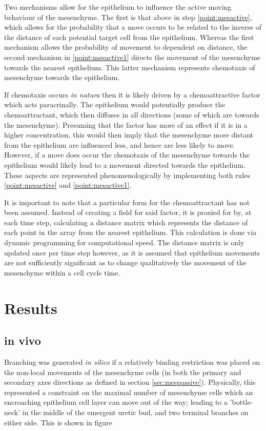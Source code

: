 \documentclass[pdftex,10pt,a4paper,twocolumn]{article}
\begin{document}
Two mechanisms allow for the epithelium to influence the active moving behaviour of the mesenchyme. The first is that above in step \ref{point:mesactive}, which allows for the probability that a move occurs to be related to the inverse of the distance of each potential target cell from the epithelium. Whereas the first mechanism allows the probability of movement to dependent on distance, the second mechanism in \ref{point:mesactive1} directs the movement of the mesenchyme towards the nearest epithelium. This latter mechanism represents chemotaxis of mesenchyme towards the epithelium.

If chemotaxis occurs \textit{in natura} then it is likely driven by a chemoattractive factor which acts paracrinally. The epithelium would potentially produce the chemoattractant, which then diffuses in all directions (some of which are towards the mesenchyme). Presuming that the factor has more of an effect if it is in a higher concentration, this would then imply that the mesenchyme more distant from the epithelium are influenced less, and hence are less likely to move. However, if a move does occur the chemotaxis of the mesenchyme towards the epithelium would likely lead to a movement directed towards the epithelium. These aspects are represented phenomenologically by implementing both rules \ref{point:mesactive} and \ref{point:mesactive1}.

It is important to note that a particular form for the chemoattractant has not been assumed. Instead of creating a field for said factor, it is proxied for by, at each time step, calculating a distance matrix which represents the distance of each point in the array from the nearest epithelium. This calculation is done via dynamic programming for computational speed. The distance matrix is only updated once per time step however, as it is assumed that epithelium movements are not sufficiently significant as to change qualitatively the movement of the mesenchyme within a cell cycle time.

\section{Results}
\subsection{in vivo}
Branching was generated \textit{in silico} if a relatively binding restriction was placed on the non-local movements of the mesenchyme cells (in both the primary and secondary axes directions as defined in section \ref{sec:mespassive}). Physically, this represented a constraint on the maximal number of mesenchyme cells which an encroaching epithelium cell layer can move out of the way; leading to a 'bottle-neck' in the middle of the emergent uretic bud, and two terminal branches on either side. This is shown in figure 
\end{document}
